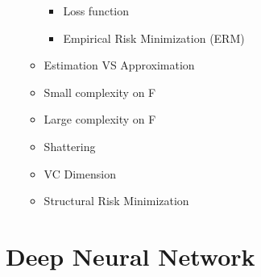 \begin{itemize}
\begin{itemize}
\begin{itemize}
            \item Loss function
            \item Empirical Risk Minimization (ERM)
        \end{itemize}
        \item Estimation VS Approximation
        \item Small complexity on F
        \item Large complexity on F
        \item Shattering
        \item VC Dimension
        \item Structural Risk Minimization
    \end{itemize}
\end{itemize}

\chapter{Deep Neural Network}
